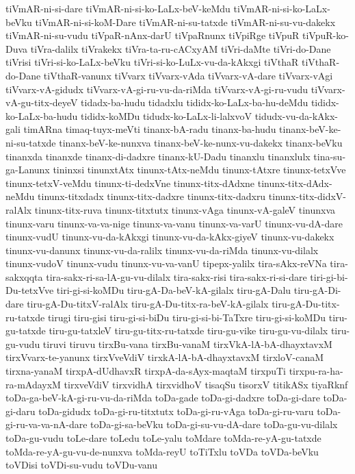 {tiVmAR-ni-si-dare
tiVmAR-ni-si-ko-LaLx-beV-keMdu
tiVmAR-ni-si-ko-LaLx-beVku
tiVmAR-ni-si-koM-Dare
tiVmAR-ni-su-tatxde
tiVmAR-ni-su-vu-dakekx
tiVmAR-ni-su-vudu
tiVpaR-nAnx-darU
tiVpaRnunx
tiVpiRge
tiVpuR
tiVpuR-ko-Duva
tiVra-dalilx
tiVrakekx
tiVra-ta-ru-cACxyAM
tiVri-daMte
tiVri-do-Dane
tiVrisi
tiVri-si-ko-LaLx-beVku
tiVri-si-ko-LuLx-vu-da-kAkxgi
tiVthaR
tiVthaR-do-Dane
tiVthaR-vanunx
tiVvarx
tiVvarx-vAda
tiVvarx-vA-dare
tiVvarx-vAgi
tiVvarx-vA-gidudx
tiVvarx-vA-gi-ru-vu-da-riMda
tiVvarx-vA-gi-ru-vudu
tiVvarx-vA-gu-titx-deyeV
tidadx-ba-hudu
tidadxlu
tididx-ko-LaLx-ba-hu-deMdu
tididx-ko-LaLx-ba-hudu
tididx-koMDu
tidudx-ko-LaLx-li-lalxvoV
tidudx-vu-da-kAkx-gali
timARna
timaq-tuyx-meVti
tinanx-bA-radu
tinanx-ba-hudu
tinanx-beV-ke-ni-su-tatxde
tinanx-beV-ke-nunxva
tinanx-beV-ke-nunx-vu-dakekx
tinanx-beVku
tinanxda
tinanxde
tinanx-di-dadxre
tinanx-kU-Dadu
tinanxlu
tinanxlulx
tina-su-ga-Lanunx
tininxsi
tinunxtAtx
tinunx-tAtx-neMdu
tinunx-tAtxre
tinunx-tetxVve
tinunx-tetxV-veMdu
tinunx-ti-dedxVne
tinunx-titx-dAdxne
tinunx-titx-dAdx-neMdu
tinunx-titxdadx
tinunx-titx-dadxre
tinunx-titx-dadxru
tinunx-titx-didxV-ralAlx
tinunx-titx-ruva
tinunx-titxtutx
tinunx-vAga
tinunx-vA-galeV
tinunxva
tinunx-varu
tinunx-va-va-nige
tinunx-va-vanu
tinunx-va-varU
tinunx-vu-dA-dare
tinunx-vudU
tinunx-vu-da-kAkxgi
tinunx-vu-da-kAkx-giyeV
tinunx-vu-dakekx
tinunx-vu-danunx
tinunx-vu-da-ralilx
tinunx-vu-da-riMda
tinunx-vu-dilalx
tinunx-vudoV
tinunx-vudu
tinunx-vu-va-vanU
tipepx-yalilx
tira-sAkx-reVNa
tira-sakxqqta
tira-sakx-ri-sa-lA-gu-vu-dilalx
tira-sakx-risi
tira-sakx-ri-si-dare
tiri-gi-bi-Du-tetxVve
tiri-gi-si-koMDu
tiru-gA-Da-beV-kA-gilalx
tiru-gA-Dalu
tiru-gA-Di-dare
tiru-gA-Du-titxV-ralAlx
tiru-gA-Du-titx-ra-beV-kA-gilalx
tiru-gA-Du-titx-ru-tatxde
tirugi
tiru-gisi
tiru-gi-si-biDu
tiru-gi-si-bi-TaTxre
tiru-gi-si-koMDu
tiru-gu-tatxde
tiru-gu-tatxleV
tiru-gu-titx-ru-tatxde
tiru-gu-vike
tiru-gu-vu-dilalx
tiru-gu-vudu
tiruvi
tiruvu
tirxBu-vana
tirxBu-vanaM
tirxVkA-lA-bA-dhayxtavxM
tirxVvarx-te-yanunx
tirxVveVdiV
tirxkA-lA-bA-dhayxtavxM
tirxloV-canaM
tirxna-yanaM
tirxpA-dUdhavxR
tirxpA-da-sAyx-maqtaM
tirxpuTi
tirxpu-ra-ha-ra-mAdayxM
tirxveVdiV
tirxvidhA
tirxvidhoV
tisaqSu
tisorxV
titikASx
tiyaRknf
toDa-ga-beV-kA-gi-ru-vu-da-riMda
toDa-gade
toDa-gi-dadxre
toDa-gi-dare
toDa-gi-daru
toDa-gidudx
toDa-gi-ru-titxtutx
toDa-gi-ru-vAga
toDa-gi-ru-varu
toDa-gi-ru-va-va-nA-dare
toDa-gi-sa-beVku
toDa-gi-su-vu-dA-dare
toDa-gu-vu-dilalx
toDa-gu-vudu
toLe-dare
toLedu
toLe-yalu
toMdare
toMda-re-yA-gu-tatxde
toMda-re-yA-gu-vu-de-nunxva
toMda-reyU
toTiTxlu
toVDa
toVDa-beVku
toVDisi
toVDi-su-vudu
toVDu-vanu
}
